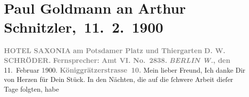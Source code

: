 

         
         \renewcommand{\erwaehntePersonen}{Personen: Cesare Borgia, Paul Goldmann, Gerhart Hauptmann, D. W. Schröder, William Shakespeare}
         \renewcommand{\erwaehnteOrte}{Orte: Berlin, Bologna, Deutsches Theater Berlin, Hotel Saxonia, Potsdamer Platz, Stresemannstraße, Tiergarten, Wien}
         \renewcommand{\erwaehnteWerke}{Werke: Der Schleier der Beatrice. Schauspiel in fünf Akten, Schluck und Jau}
               \section[ Paul Goldmann an Arthur Schnitzler, 11. 2. 1900]{ Paul Goldmann an Arthur Schnitzler, 11. 2. 1900}\nopagebreak{}\rehead{ }\begin{ledgroupsized}[t]{13cm}\normalsize\beginnumbering{} \toendnotes[C]{\smallbreak\pagebreak[2]} 
\toendnotes[C]{\smallbreak}\pstart
           \noindent{}\centering{}{\pb}\textcolor{gray}{\textbf{\textbf{HOTEL SAXONIA}}}\pend
           \pstart
           \noindent{}\raggedleft{}\textcolor{gray}{\textbf{am Potsdamer Platz und
                        Thiergarten}}\pend
           \pstart
           \noindent{}\centering{}\textcolor{gray}{\textbf{D. W. SCHRÖDER.}}\pend
           \pstart
           \noindent{}\textcolor{gray}{\textbf{Fernsprecher:}}\pend
           \pstart
           \textcolor{gray}{\textbf{\textbf{Amt VI. No. 2838.}}}\pend
           \pstart
           \raggedleft{}\textcolor{gray}{\textbf{\emph{BERLIN W.}, den}}{ }11. Februar \textcolor{gray}{\textbf{1}}900. \pend
           \pstart
           \raggedleft{}\textcolor{gray}{\textbf{Königgrätzerstrasse 10.}}\pend
           \pstart{}Mein lieber Freund,\pend\pstart
           Ich danke Dir von Herzen für Dein Stück. In den Nächten, die auf die ſchwere Arbeit dieſer Tage folgten, habe

\end{ledgroupsized}
